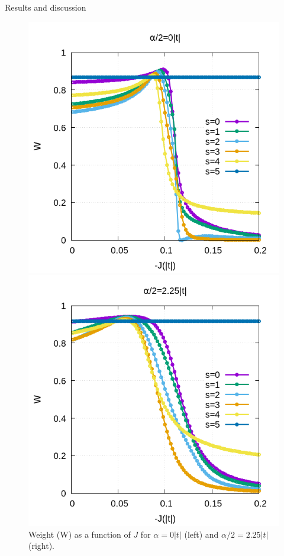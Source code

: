 \documentclass[12pt,twoside]{report}
\begin{document}
\begin{chapter}{Results and discussion}
	\begin{figure}[h!]
		\centering
		\hspace{-2cm}
		\begin{minipage}{0.4\textwidth}
			\includegraphics[scale=0.3]{W_vs_J_sites_2-xrep-01.png}
		\end{minipage}
		\hspace{2cm}
		\begin{minipage}{0.4\textwidth}
			\includegraphics[scale=0.3]{W_vs_J_sites_2-xrep-225.png}
		\end{minipage}
		\caption{\label{fig_0_225} Weight (W) as a function of $J$ for $\alpha = 0 |t|$ (left) and $\alpha \slash 2 = 2.25|t|$ (right). }
	\end{figure}
	

\end{chapter}
\end{document}
